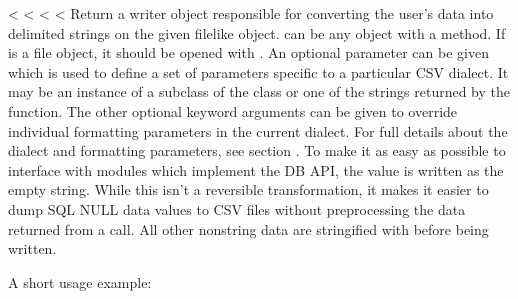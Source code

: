 \documentclass[letterpaper,10pt,english]{sphinxmanual}
\begin{document}
\begin{fulllineitems}
\label{\detokenize{csv:csv.writer}}
<%
\pysigstartsignatures
<%
<%
<%
Return a writer object responsible for converting the user’s data into delimited
strings on the given file\sphinxhyphen{}like object.   can be any object with a
 method.  If  is a file object, it should be opened with
 \sphinxfootnotemark[1].  An optional 
parameter can be given which is used to define a set of parameters specific to a
particular CSV dialect.  It may be an instance of a subclass of the
{\hyperref[\detokenize{csv:csv.Dialect}]{}} class or one of the strings returned by the
{\hyperref[\detokenize{csv:csv.list_dialects}]{}} function.  The other optional  keyword arguments
can be given to override individual formatting parameters in the current
dialect.  For full details about the dialect and formatting parameters, see
section {\hyperref[\detokenize{csv:csv-fmt-params}]{}}. To make it
as easy as possible to interface with modules which implement the DB API, the
value  is written as the empty string.  While this isn’t a
reversible transformation, it makes it easier to dump SQL NULL data values to
CSV files without preprocessing the data returned from a  call.
All other non\sphinxhyphen{}string data are stringified with  before being written.

A short usage example:


\end{fulllineitems}
\end{document}
